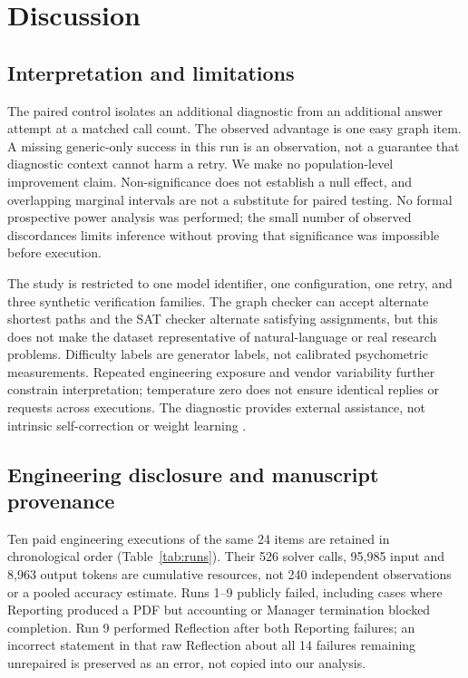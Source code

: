 \section{Discussion}
\subsection{Interpretation and limitations}
The paired control isolates an additional diagnostic from an additional answer attempt at a matched call count. The observed advantage is one easy graph item. A missing generic-only success in this run is an observation, not a guarantee that diagnostic context cannot harm a retry. We make no population-level improvement claim. Non-significance does not establish a null effect, and overlapping marginal intervals are not a substitute for paired testing. No formal prospective power analysis was performed; the small number of observed discordances limits inference without proving that significance was impossible before execution.

The study is restricted to one model identifier, one configuration, one retry, and three synthetic verification families. The graph checker can accept alternate shortest paths and the SAT checker alternate satisfying assignments, but this does not make the dataset representative of natural-language or real research problems. Difficulty labels are generator labels, not calibrated psychometric measurements. Repeated engineering exposure and vendor variability further constrain interpretation; temperature zero does not ensure identical replies or requests across executions. The diagnostic provides external assistance, not intrinsic self-correction or weight learning \citep{jie2023fd36c5c8,aman2023820a9974}.

\subsection{Engineering disclosure and manuscript provenance}
Ten paid engineering executions of the same 24 items are retained in chronological order (Table~\ref{tab:runs}). Their 526 solver calls, 95,985 input and 8,963 output tokens are cumulative resources, not 240 independent observations or a pooled accuracy estimate. Runs 1--9 publicly failed, including cases where Reporting produced a PDF but accounting or Manager termination blocked completion. Run 9 performed Reflection after both Reporting failures; an incorrect statement in that raw Reflection about all 14 failures remaining unrepaired is preserved as an error, not copied into our analysis.

